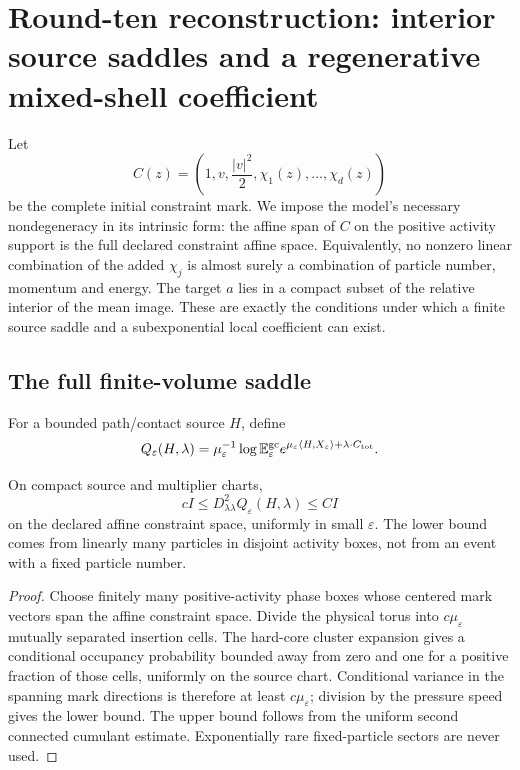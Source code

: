\section{Round-ten reconstruction: interior source saddles and a regenerative mixed-shell coefficient}
\label{sec:r10-b1}

Let
\[
 C(z)=\left(1,v,\frac{|v|^2}{2},\chi_1(z),\ldots,\chi_d(z)\right)
\]
be the complete initial constraint mark.  We impose the model's necessary
nondegeneracy in its intrinsic form: the affine span of \(C\) on the positive
activity support is the full declared constraint affine space.  Equivalently,
no nonzero linear combination of the added \(\chi_j\) is almost surely a
combination of particle number, momentum and energy.  The target \(a\) lies in
a compact subset of the relative interior of the mean image.  These are
exactly the conditions under which a finite source saddle and a
subexponential local coefficient can exist.

\subsection{The full finite-volume saddle}

For a bounded path/contact source \(H\), define
\[
 Q_\varepsilon(H,\lambda)=\mu_\varepsilon^{-1}
 \log\mathbb E^{\rm gc}_\varepsilon
 e^{\mu_\varepsilon\langle H,X_\varepsilon\rangle+
       \lambda\cdot C_{\rm tot}}.
\]

\begin{lemma}
\label{lem:r10-b1-covariance}
On compact source and multiplier charts,
\[
 cI\le D^2_{\lambda\lambda}Q_\varepsilon(H,\lambda)\le CI
\]
on the declared affine constraint space, uniformly in small \(\varepsilon\).
The lower bound comes from linearly many particles in disjoint activity boxes,
not from an event with a fixed particle number.
\end{lemma}

\begin{proof}
Choose finitely many positive-activity phase boxes whose centered mark vectors
span the affine constraint space.  Divide the physical torus into
\(c\mu_\varepsilon\) mutually separated insertion cells.  The hard-core
cluster expansion gives a conditional occupancy probability bounded away
from zero and one for a positive fraction of those cells, uniformly on the
source chart.  Conditional variance in the spanning mark directions is
therefore at least \(c\mu_\varepsilon\); division by the pressure speed gives
the lower bound.  The upper bound follows from the uniform second connected
cumulant estimate.  Exponentially rare fixed-particle sectors are never used.
\end{proof}

